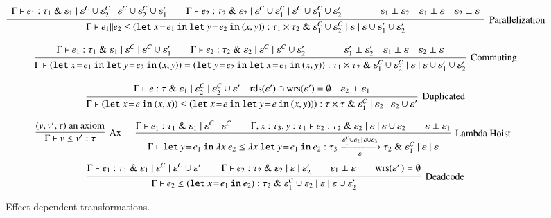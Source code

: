 \documentclass[nocopyrightspace,preprint]{sigplanconf}
\newcommand{\keywd}[1]{\mathtt{#1}}
\newcommand{\myeffto}[3]{\xrightarrow[#2]{#1\,\mid\, #3}}
\newcommand{\letin}[2]{\keywd{let}\:{#1}\!=\!{#2}\:\keywd{in}\:}
\newcommand{\rdsin}[1]{\mathrm{rds}({#1})}
\newcommand{\wrsin}[1]{\mathrm{wrs}({#1})}
\newcommand{\mypar}[2]{#1 \| #2}
\newcommand{\eff}{\varepsilon}
\newcommand{\myety}[4]{{#1}\mathrel{\&}{#2} \mid #3 \mid #4}
\begin{document}
\begin{figure*}
\[
\infer[\textrm{Parallelization}]{\Gamma\vdash \mypar{e_1}{e_2} \leq
(\letin{x}{e_1}{\letin{y}{e_2} (x,y)}) : 
\myety{\tau_1 \times \tau_2}
{\eff_1^C \cup \eff_2^C}
{\eff}{ \eff \cup \eff_1' \cup \eff_2'}}
{\begin{array}{l}
 \Gamma\vdash e_1:\myety{\tau_1}
{\eff_1}{\eff^C \cup \eff_2^C}{\eff^C \cup \eff_2^C \cup \eff_1'} \qquad \Gamma\vdash e_2:\myety{\tau_2}
{\eff_2}{\eff^C \cup \eff_1^C}{\eff^C \cup \eff_1^C \cup \eff_2'} \qquad \qquad 
\eff_1 \perp \eff_2 \quad \eff_1 \perp \eff \quad \eff_2 \perp \eff
  \end{array}
}
\]

\[
\infer[\textrm{Commuting}]{
\Gamma\vdash (\letin{x}{e_1}{\letin{y}{e_2} (x,y)}) = (\letin{y}{e_2}{\letin{x}{e_1} (x,y)}) : 
\myety{\tau_1 \times \tau_2}
{\eff_1^C \cup \eff_2^C} {\eff}{ \eff \cup \eff_1' \cup \eff_2'}}
{\begin{array}{l}
 \Gamma\vdash e_1:\myety{\tau_1} {\eff_1}{\eff^C}{\eff^C \cup \eff_1'} \qquad 
\Gamma\vdash e_2:\myety{\tau_2}
{\eff_2}{\eff^C}{\eff^C \cup \eff_2'} \qquad \qquad
\eff_1' \perp \eff_2' \quad \eff_1 \perp \eff \quad \eff_2 \perp \eff
  \end{array}
}
\]

\[
\begin{array}{c}
 \infer[\textrm{Duplicated}]{\Gamma\vdash
(\letin{x}{e} (x,x)) \leq
(\letin{x}{e} {\letin{y}{e} (x,y))}) : \myety{\tau\times \tau} {\eff_1^C} {\eff_2}{\eff_2 \cup \eff'}}
{\Gamma\vdash e:\myety{\tau} {\eff_1}{\eff_2^C}{\eff_2^C \cup \eff'} 
 \quad
\rdsin{\eff'} \cap \wrsin{\eff'} = \emptyset 
\quad \eff_2 \perp \eff_1 
}
\end{array}
\]

\[
\infer[\textrm{Ax}]{\Gamma\vdash v\leq v':\tau}{(v,v',\tau)\mbox{ an axiom}}\quad 
\begin{array}{c}
\infer[\textrm{Lambda Hoist}]{
 \Gamma\vdash \letin{y}{e_1} {\lambda x. e_2} 
\leq \lambda x . \letin{y}{e_1}{e_2} 
: 
\myety{\tau_3 \myeffto{\eff_1^C\cup\eff_2}{\eff}{\eff\cup\eff_3} \tau_2}{\eff_1^C}{\eff}{\eff}}
{\Gamma \vdash e_1: \myety{\tau_1} {\eff_1}{\eff^C}{\eff^C} 
 \qquad
 \Gamma, x:\tau_3, y:\tau_1 \vdash e_2: \myety{\tau_2} {\eff_2}{\eff}{\eff\cup\eff_2}\qquad \eff\perp\eff_1}
\end{array}
\]
\[
\begin{array}{c}
\infer[\textrm{Deadcode}]{
\Gamma\vdash e_2 \leq (\letin{x}{e_1}{e_2}) : \myety{\tau_2}{\eff_1^C\cup\eff_2}{\eff}{\eff \cup \eff_2'} }
{\Gamma \vdash e_1: \myety{\tau_1} {\eff_1}{\eff^C}{\eff^C \cup \eff_1'} 
 \qquad
 \Gamma \vdash e_2: \myety{\tau_2} {\eff_2}{\eff}{\eff_2'} 
 \qquad 
 \eff_1 \perp \eff
 \qquad 
 \textrm{$\wrsin{\eff_1'}=\emptyset$}
}
\end{array}  
\]


\caption{Effect-dependent transformations\label{eqth}.}
\vspace{-3mm}
\end{figure*}
\end{document}

